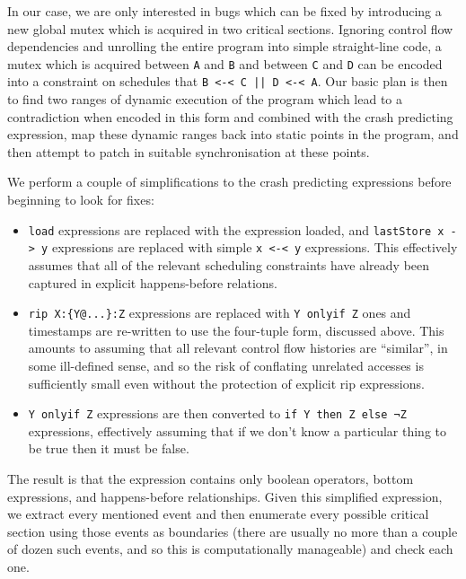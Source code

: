 \documentclass[10pt,a4paper,twocolumn]{article}
\begin{document}
In our case, we are only interested in bugs which can be fixed by
introducing a new global mutex which is acquired in two critical
sections.  Ignoring control flow dependencies and unrolling the entire
program into simple straight-line code, a mutex which is acquired
between \verb|A| and \verb|B| and between \verb|C| and \verb|D| can be
encoded into a constraint on schedules that \verb^B <-< C || D <-< A^.
Our basic plan is then to find two ranges of dynamic execution of the
program which lead to a contradiction when encoded in this form and
combined with the crash predicting expression, map these dynamic
ranges back into static points in the program, and then attempt to
patch in suitable synchronisation at these points.

We perform a couple of simplifications to the crash predicting
expressions before beginning to look for fixes:

\begin{itemize}
\item \verb|load| expressions are replaced with the expression loaded,
  and \verb|lastStore x -> y| expressions are replaced with simple
  \verb|x <-< y| expressions.  This effectively assumes that all of
  the relevant scheduling constraints have already been captured in
  explicit happens-before relations.

\item \verb|rip X:{Y@...}:Z| expressions are replaced with
  \verb|Y onlyif Z| ones and timestamps are re-written to use the
  four-tuple form, discussed above.  This amounts to
  assuming that all relevant control flow histories are ``similar'',
  in some ill-defined sense, and so the risk of conflating unrelated
  accesses is sufficiently small even without the protection of
  explicit rip expressions.

\item \verb|Y onlyif Z| expressions are then converted to
  \verb|if Y then Z else ¬Z| expressions, effectively assuming that if
  we don't know a particular thing to be true then it must be false.
\end{itemize}

The result is that the expression contains only boolean operators,
bottom expressions, and happens-before relationships.  Given this
simplified expression, we extract every mentioned event and then
enumerate every possible critical section using those events as
boundaries (there are usually no more than a couple of dozen such
events, and so this is computationally manageable) and check each one.
\end{document}
